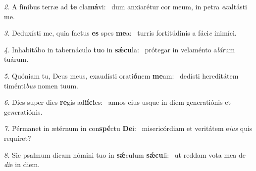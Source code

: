 \begin{psalmus}
\textit{\color{red}2.} A fínibus terræ ad \textbf{te} cla\textbf{má}vi:~\grestar{}
dum anxiarétur cor meum, in petra \textit{ex}altásti me.~\Abardot{}

\textit{\color{red}3.} Deduxísti me, quia factus \textbf{es} spes \textbf{me}a:~\grestar{}
turris fortitúdinis a fáci\textit{e} inimíci.~\Abardot{}

\textit{\color{red}4.} Inhabitábo in tabernáculo \textbf{tu}o in \textbf{sǽ}\textbf{cu}la:~\grestar{}
prótegar in velaménto a\textit{lá}rum tuárum.~\Abardot{}

\textit{\color{red}5.} Quóniam tu, Deus meus, exaudísti orati\textbf{ó}nem \textbf{me}am:~\grestar{}
dedísti hereditátem timénti\textit{bus} nomen tuum.~\Abardot{}

\textit{\color{red}6.} Dies super dies \textbf{re}gis ad\textbf{ií}\textbf{ci}es:~\grestar{}
annos eius usque in diem generatiónis et ge\textit{ne}ratiónis.~\Abardot{}

\textit{\color{red}7.} Pérmanet in ætérnum in con\textbf{spé}ctu \textbf{De}i:~\grestar{}
misericórdiam et veritátem e\textit{ius} quis requíret?~\Abardot{}

\textit{\color{red}8.} Sic psalmum dicam nómini tuo in \textbf{sǽ}culum \textbf{sǽ}\textbf{cu}li:~\grestar{}
ut reddam vota mea de \textit{di}e in diem.~\Abardot{}
\end{psalmus}
